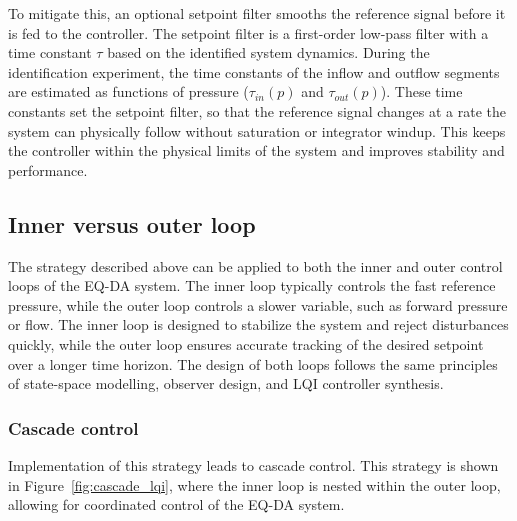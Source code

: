 \documentclass[12pt,a4paper]{article}
\begin{document}
To mitigate this, an optional setpoint filter smooths the reference signal before it is fed to the controller. The setpoint filter is a first-order low-pass filter with a time constant $\tau$ based on the identified system dynamics. During the identification experiment, the time constants of the inflow and outflow segments are estimated as functions of pressure ($\tau_{in}(p)$ and $\tau_{out}(p)$). These time constants set the setpoint filter, so that the reference signal changes at a rate the system can physically follow without saturation or integrator windup. This keeps the controller within the physical limits of the system and improves stability and performance.

\subsection{Inner versus outer loop}
\label{sec:inner_vs_outer_loop}
The strategy described above can be applied to both the inner and outer control loops of the EQ-DA system. The inner loop typically controls the fast reference pressure, while the outer loop controls a slower variable, such as forward pressure or flow. The inner loop is designed to stabilize the system and reject disturbances quickly, while the outer loop ensures accurate tracking of the desired setpoint over a longer time horizon. The design of both loops follows the same principles of state-space modelling, observer design, and LQI controller synthesis. 
\subsubsection{Cascade control}
\label{sec:cascade_control}
Implementation of this strategy leads to cascade control. This strategy is shown in Figure~\ref{fig:cascade_lqi}, where the inner loop is nested within the outer loop, allowing for coordinated control of the EQ-DA system.
\end{document}
